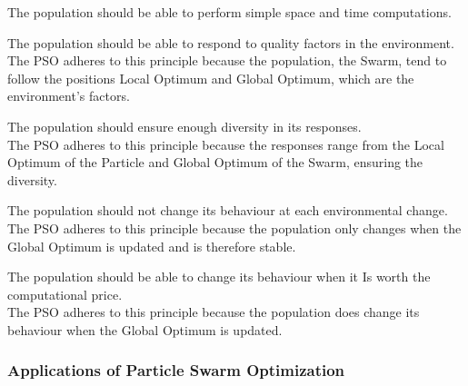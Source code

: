 The population should be able to perform simple space and time computations.

The population should be able to respond to quality factors in the environment.
\\[0.3cm]The PSO adheres to this principle because the population, the Swarm, tend to follow the positions Local Optimum and Global Optimum, which are the environment's factors.

The population should ensure enough diversity in its responses.
\\[0.3cm]The PSO adheres to this principle because the responses range from the Local Optimum of the Particle and Global Optimum of the Swarm, ensuring the diversity.

The population should not change its behaviour at each environmental change.
\\[0.3cm]The PSO adheres to this principle because the population only changes when the Global Optimum is updated and is therefore stable.

The population should be able to change its behaviour when it Is worth the computational price.
\\[0.3cm]The PSO adheres to this principle because the population does change its behaviour when the Global Optimum is updated.

\subsubsection{Applications of Particle Swarm Optimization}

